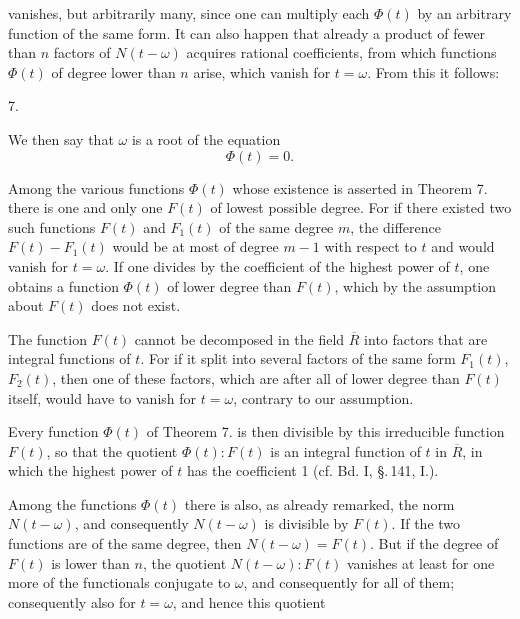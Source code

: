 vanishes, but arbitrarily many, since one can multiply each
$\Phi(t)$ by an arbitrary function of the same form. It can
also happen that already a product of fewer than $n$ factors
of $N(t-\omega)$ acquires rational coefficients, from which
functions $\Phi(t)$ of degree lower than $n$ arise, which
vanish for $t = \omega$. From this it follows:

7. 

We then say that $\omega$ is a root of the equation
\[
\Phi(t) = 0.
\]

Among the various functions $\Phi(t)$ whose existence is
asserted in Theorem 7. there is one and only one $F(t)$ of
lowest possible degree. For if there existed two such
functions $F(t)$ and $F_1(t)$ of the same degree $m$, the
difference $F(t) - F_1(t)$ would be at most of degree
$m - 1$ with respect to $t$ and would vanish for $t = \omega$.
If one divides by the coefficient of the highest power of $t$,
one obtains a function $\Phi(t)$ of lower degree than $F(t)$,
which by the assumption about $F(t)$ does not exist.

The function $F(t)$ cannot be decomposed in the field
$\overline{R}$ into factors that are integral functions of $t$.
For if it split into several factors of the same form
$F_1(t)$, $F_2(t)$, then one of these factors, which are after
all of lower degree than $F(t)$ itself, would have to vanish
for $t = \omega$, contrary to our assumption.

Every function $\Phi(t)$ of Theorem 7. is then divisible by
this irreducible function $F(t)$, so that the quotient
$\Phi(t):F(t)$ is an integral function of $t$ in $\overline{R}$,
in which the highest power of $t$ has the coefficient 1
(cf. Bd. I, \S.\,141, I.).

Among the functions $\Phi(t)$ there is also, as already
remarked, the norm $N(t-\omega)$, and consequently
$N(t-\omega)$ is divisible by $F(t)$. If the two functions are
of the same degree, then $N(t-\omega) = F(t)$. But if the
degree of $F(t)$ is lower than $n$, the quotient
$N(t-\omega):F(t)$ vanishes at least for one more of the
functionals conjugate to $\omega$, and consequently for all of
them; consequently also for $t = \omega$, and hence this
quotient
